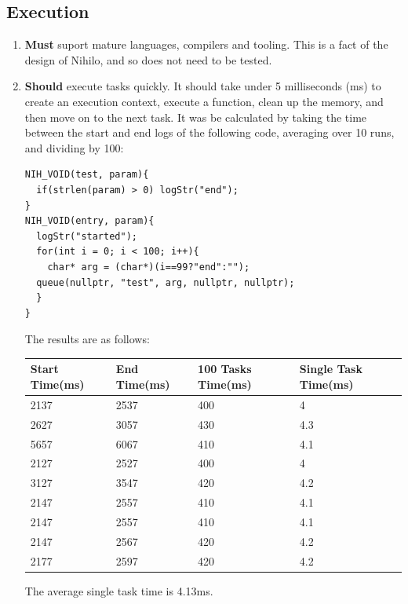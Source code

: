 \documentclass{article}
\begin{document}
\subsection{Execution}
\begin{enumerate}
\item \textbf{Must} suport mature languages, compilers and tooling. This is a fact of the design of Nihilo, and so does not need to be tested.
\item \textbf{Should} execute tasks quickly. It should take under 5 milliseconds (ms) to create an execution context, execute a function, clean up the memory, and then move on to the next task. It was be calculated by taking the time between the start and end logs of the following code, averaging over 10 runs, and dividing by 100:
\begin{tcolorbox}[colback=white,grow to left by=2.5mm,grow to right by=2.5mm,left*=0mm,right*=0mm,sharp corners]
\begin{verbatim}
NIH_VOID(test, param){
  if(strlen(param) > 0) logStr("end");
}
NIH_VOID(entry, param){
  logStr("started");
  for(int i = 0; i < 100; i++){
    char* arg = (char*)(i==99?"end":"");
  queue(nullptr, "test", arg, nullptr, nullptr);
  }
}
\end{verbatim}
\end{tcolorbox}

The results are as follows:
\begin{table}[H]
\begin{tabular}{|l|l|l|l|}
\hline
Start Time(ms)		&End Time(ms)		&100 Tasks Time(ms)		&Single Task Time(ms)		\\ \hline
2137							&2537						&400    							&4\\ \hline
2627							&3057						&430	    						&4.3\\ \hline
5657							&6067						&410		    					&4.1\\ \hline
2127							&2527						&400			    				&4\\ \hline
3127							&3547						&420				    			&4.2\\ \hline
2147							&2557						&410					    		&4.1\\ \hline
2147							&2557						&410						    	&4.1\\ \hline
2147							&2567						&420						    	&4.2\\ \hline
2177							&2597						&420							    &4.2 \\ \hline
\end{tabular}
\end{table}

The average single task time is 4.13ms.

\end{enumerate}
\end{document}
